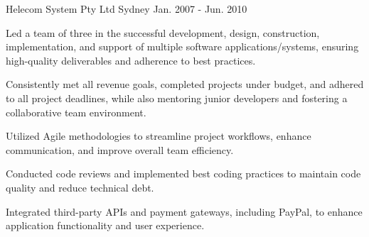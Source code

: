 \begin{cventries}
  {Helecom System Pty Ltd} %
  {Sydney} %
  {Jan. 2007 - Jun. 2010} %
  { \begin{cvitems} %
      \item {Led a team of three in the successful development, design, construction, implementation, and support of multiple software applications/systems, ensuring high-quality deliverables and adherence to best practices.}
      \item {Consistently met all revenue goals, completed projects under budget, and adhered to all project deadlines, while also mentoring junior developers and fostering a collaborative team environment.}
      \item {Utilized Agile methodologies to streamline project workflows, enhance communication, and improve overall team efficiency.}
      \item {Conducted code reviews and implemented best coding practices to maintain code quality and reduce technical debt.}
      \item {Integrated third-party APIs and payment gateways, including PayPal, to enhance application functionality and user experience.}
    \end{cvitems} }

\end{cventries}